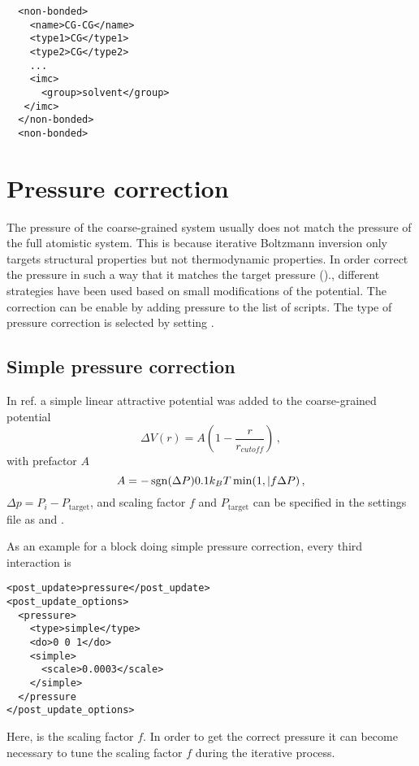 \begin{lstlisting}
  <non-bonded>
    <name>CG-CG</name>
    <type1>CG</type1>
    <type2>CG</type2>
    ...
    <imc>
      <group>solvent</group>
   </imc>
  </non-bonded>
  <non-bonded>
\end{lstlisting}



\section{Pressure correction}

The pressure of the coarse-grained system usually does not match the pressure of the full atomistic system. This is because iterative Boltzmann inversion only targets structural properties but not thermodynamic properties. In order correct the pressure in such a way that it matches the target pressure ()., different strategies have been used based on small modifications of the potential. The correction can be enable by adding pressure to the list of  scripts. The type of pressure correction is selected by setting .

\subsection{Simple pressure correction}
In ref.\cite{Reith:2003} a simple linear attractive potential was added to the coarse-grained potential
\begin{equation}
  \Delta V(r)=A \left( 1-\frac{r}{r_{cutoff}} \right) \,,
\end{equation}
with prefactor $A$
\begin{equation}
  A = -\operatorname{sgn}(\Delta P)0.1k_{B}T\min(1,|f\Delta P) \,,
\end{equation}
$\Delta p=P_i-P_\text{target}$, and scaling factor $f$ and $P_\text{target}$ can be specified in the settings file as  and .

As an example for a block doing simple pressure correction, every third interaction is
\begin{lstlisting}
<post_update>pressure</post_update>
<post_update_options>
  <pressure>
    <type>simple</type>
    <do>0 0 1</do>
    <simple>
      <scale>0.0003</scale>
    </simple>
  </pressure
</post_update_options>
\end{lstlisting}
Here,  is the scaling factor $f$. In order to get the correct pressure it can become necessary to tune the scaling factor $f$ during the iterative process.

